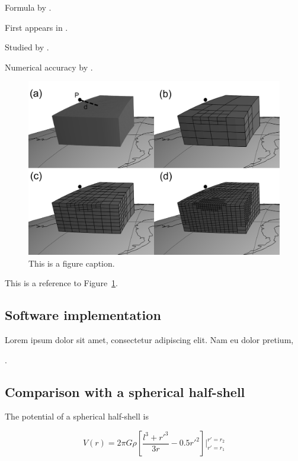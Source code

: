 \documentclass[paper,twocolumn,twoside]{geophysics}
\begin{document}
Formula by \citet{Grombein2013}.

First appears in \citet{Asgharzadeh2007}.

Studied by \citet{Wild-Pfeiffer2008}.

Numerical accuracy by \citet{Ku1977}.

\begin{figure}
    \centering
    \includegraphics[width=\columnwidth]{figs/tesseroid-split.png}
    \caption{This is a figure caption.}
    \label{fig:split}
\end{figure}

This is a reference to Figure~\ref{fig:split}.

\subsection{Software implementation}

Lorem ipsum dolor sit amet, consectetur adipiscing elit. Nam eu dolor pretium,

\citet{Barrera-Figueroa2006}.

\subsection{Comparison with a spherical half-shell}


The potential of a spherical half-shell is

\begin{equation}
    V(r) = 2\pi G \rho \left[ \dfrac{l^3 + {r'}^3}{3r} - 0.5 {r'}^2 \right]
           \Biggr \rvert_{r'=r_1}^{r'=r_2}
    \label{eq:halfshell-pot}
\end{equation}
\end{document}

